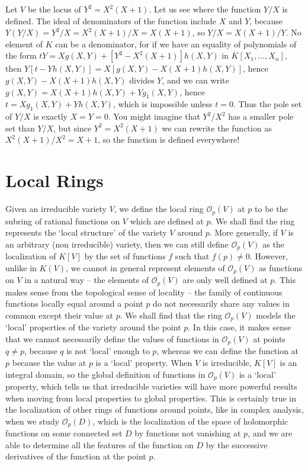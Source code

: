 \begin{example}
    Let $V$ be the locus of $Y^2 = X^2(X+1)$. Let us see where the function $Y/X$ is defined. The ideal of denominators of the function include $X$ and $Y$, because $Y(Y/X) = Y^2/X = X^2(X+1)/X = X(X+1)$, so $Y/X = X(X+1)/Y$. No element of $K$ can be a denominator, for if we have an equality of polynomials of the form $tY = Xg(X,Y) + [Y^2 - X^2(X+1)]h(X,Y)$ in $K[X_1, \dots, X_n]$, then $Y[t - Yh(X,Y)] = X[g(X,Y) - X(X+1)h(X,Y)]$, hence $g(X,Y) - X(X+1)h(X,Y)$ divides $Y$, and we can write $g(X,Y) = X(X+1)h(X,Y) + Yg_1(X,Y)$, hence $t = Xg_1(X,Y) + Yh(X,Y)$, which is impossible unless $t = 0$. Thus the pole set of $Y/X$ is exactly $X = Y = 0$. You might imagine that $Y^2/X^2$ has a smaller pole set than $Y/X$, but since $Y^2 = X^2(X+1)$ we can rewrite the function as $X^2(X+1)/X^2 = X+1$, so the function is defined everywhere!
\end{example}

\section{Local Rings}

Given an irreducible variety $V$, we define the local ring $\mathcal{O}_p(V)$ at $p$ to be the subring of rational functions on $V$ which are defined at $p$. We shall find the ring represents the `local structure' of the variety $V$ around $p$. More generally, if $V$ is an arbitrary (non irreducible) variety, then we can still define $\mathcal{O}_p(V)$ as the localization of $K[V]$ by the set of functions $f$ such that $f(p) \neq 0$. However, unlike in $K(V)$, we cannot in general represent elements of $\mathcal{O}_p(V)$ as functions on $V$ in a natural way -- the elements of $\mathcal{O}_p(V)$ are only well defined at $p$. This makes sense from the topological sense of locality -- the family of continuous functions locally equal around a point $p$ do not necessarily share any values in common except their value at $p$. We shall find that the ring $\mathcal{O}_p(V)$ models the `local' properties of the variety around the point $p$. In this case, it makes sense that we cannot necessarily define the values of functions in $\mathcal{O}_p(V)$ at points $q \neq p$, because $q$ is not `local' enough to $p$, whereas we can define the function at $p$ because the value at $p$ is a `local' property. When $V$ is irreducible, $K[V]$ is an integral domain, so the global definition of functions in $\mathcal{O}_p(V)$ is a `local' property, which tells us that irreducible varieties will have more powerful results when moving from local properties to global properties. This is certainly true in the localization of other rings of functions around points, like in complex analysis, when we study $\mathcal{O}_p(D)$, which is the localization of the space of holomorphic functions on some connected set $D$ by functions not vanishing at $p$, and we are able to determine all the features of the function on $D$ by the successive derivatives of the function at the point $p$.

